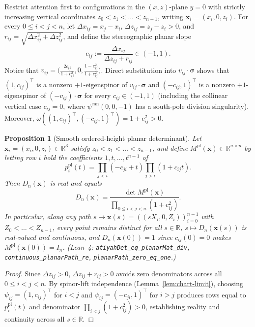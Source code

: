 \documentclass[11pt,reqno]{amsart}
\newtheorem{proposition}[theorem]{Proposition}
\theoremstyle{remark}
\newcommand{\R}{\mathbb{R}}
\begin{document}
Restrict attention first to configurations in the $(x, z)$-plane $y = 0$ with strictly increasing vertical coordinates $z_0 < z_1 < \dots < z_{n-1}$, writing $\mathbf{x}_i = (x_i, 0, z_i)$.
For every $0 \le i < j < n$, let $\Delta x_{ij} = x_j - x_i$, $\Delta z_{ij} = z_j - z_i > 0$, and $r_{ij} = \sqrt{\Delta x_{ij}^2 + \Delta z_{ij}^2}$, and define the stereographic planar slope
\begin{equation}\label{eq:planar-slope}
  c_{ij} := \frac{\Delta x_{ij}}{\Delta z_{ij} + r_{ij}} \in (-1, 1).
\end{equation}
Notice that $v_{ij} = \bigl(\frac{2c_{ij}}{1 + c_{ij}^2}, 0, \frac{1 - c_{ij}^2}{1 + c_{ij}^2}\bigr)$.
Direct substitution into $v_{ij} \cdot \boldsymbol{\sigma}$ shows that $(1, c_{ij})^\top$ is a nonzero $+1$-eigenspinor of $v_{ij} \cdot \boldsymbol{\sigma}$ and $(-c_{ij}, 1)^\top$ is a nonzero $+1$-eigenspinor of $(-v_{ij}) \cdot \boldsymbol{\sigma}$ for every $c_{ij} \in (-1, 1)$ (including the collinear vertical case $c_{ij} = 0$, where $\psi^{\mathrm{can}}(0, 0, -1)$ has a south-pole division singularity).
Moreover, $\omega((1, c_{ij})^\top, (-c_{ij}, 1)^\top) = 1 + c_{ij}^2 > 0$.

\begin{proposition}[Smooth ordered-height planar determinant]\label{prop:planar}
Let $\mathbf{x}_i = (x_i, 0, z_i) \in \R^3$ satisfy $z_0 < z_1 < \dots < z_{n-1}$, and define $M^{\mathrm{pl}}(\mathbf{x}) \in \R^{n \times n}$ by letting row $i$ hold the coefficients $1, t, \dots, t^{n-1}$ of
\[
  p_i^{\mathrm{pl}}(t) = \prod_{j < i} (-c_{ji} + t) \prod_{j > i} (1 + c_{ij} t).
\]
Then $D_n(\mathbf{x})$ is real and equals
\[
  D_n(\mathbf{x}) = \frac{\det M^{\mathrm{pl}}(\mathbf{x})}{\prod_{0 \le i < j < n} (1 + c_{ij}^2)}.
\]
In particular, along any path $s \mapsto \mathbf{x}(s) = ((s X_i, 0, Z_i))_{i=0}^{n-1}$ with $Z_0 < \dots < Z_{n-1}$, every point remains distinct for all $s \in \R$, $s \mapsto D_n(\mathbf{x}(s))$ is real-valued and continuous, and $D_n(\mathbf{x}(0)) = 1$ since $c_{ij}(0) = 0$ makes $M^{\mathrm{pl}}(\mathbf{x}(0)) = I_n$.
(Lean~4: \texttt{atiyahDet\_eq\_planarMat\_div}, \texttt{continuous\_planarPath\_re}, \texttt{planarPath\_zero\_eq\_one}.)
\end{proposition}

\begin{proof}
Since $\Delta z_{ij} > 0$, $\Delta z_{ij} + r_{ij} > 0$ avoids zero denominators across all $0 \le i < j < n$.
By spinor-lift independence (Lemma~\ref{lem:chart-limit}), choosing $\psi_{ij} = (1, c_{ij})^\top$ for $i < j$ and $\psi_{ij} = (-c_{ji}, 1)^\top$ for $i > j$ produces rows equal to $p_i^{\mathrm{pl}}(t)$ and denominator $\prod_{i<j} (1 + c_{ij}^2) > 0$, establishing reality and continuity across all $s \in \R$.
\end{proof}
\end{document}
